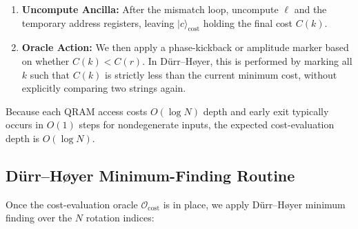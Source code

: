 \documentclass[11pt,letterpaper]{article}
\begin{document}
\begin{enumerate}
\begin{enumerate}
\begin{enumerate}
\[              \;\xrightarrow{\;\mathrm{QRAMRead}\;}\;
              \lvert (k+\ell)\bmod N\rangle \lvert s_{(k+\ell)\bmod N}\rangle_{\text{data}_1},
            \]
            \[
              \lvert (r+\ell)\bmod N\rangle \lvert 0\rangle_{\text{data}_2}
              \;\xrightarrow{\;\mathrm{QRAMRead}\;}\;
              \lvert (r+\ell)\bmod N\rangle \lvert s_{(r+\ell)\bmod N}\rangle_{\text{data}_2}.
            \]
            \item Compare \(\lvert s_{(k+\ell)\bmod N}\rangle\) vs.\ \(\lvert s_{(r+\ell)\bmod N}\rangle\) using a quantum comparator: if \(s_{(k+\ell)\bmod N} \neq s_{(r+\ell)\bmod N}\), 
              deposit penalty \(\delta\) into \(\lvert c\rangle_{\text{cost}}\), then break the loop. Where \(\delta\) is defined as 
              \[\delta = 
              \begin{cases}
                0, & s_{(k+\ell)\bmod N} < s_{(r+\ell)\bmod N}, \\
                1, & s_{(k+\ell)\bmod N} > s_{(r+\ell)\bmod N},
              \end{cases}
              \]
              
            \item If \(s_{(k+\ell)\bmod N} = s_{(r+\ell)\bmod N}\), increment \(\ell\leftarrow\ell+1\) and continue.
        \end{enumerate}
        \item If all \(N\) positions match, leave \(\lvert c\rangle_{\text{cost}}\) as zero (indicating equality).
    \end{enumerate}
    \item \textbf{Uncompute Ancilla:} After the mismatch loop, uncompute \(\ell\) and the temporary address registers, leaving \(\lvert c\rangle_{\text{cost}}\) holding the final cost \(C(k)\).
    \item \textbf{Oracle Action:} We then apply a phase-kickback or amplitude marker based on whether \(C(k) < C(r)\). In D{\"u}rr--H{\o}yer, this is performed by marking all \(k\) such that \(C(k)\) is strictly less than the current minimum cost, without explicitly comparing two strings again.
\end{enumerate}

Because each QRAM access costs \(O(\log N)\) depth and early exit typically occurs in \(O(1)\) steps for nondegenerate inputs, the expected cost-evaluation depth is \(O(\log N)\).

\subsection{D{\"u}rr--H{\o}yer Minimum-Finding Routine}
\label{sec:algorithm:dh}
Once the cost-evaluation oracle \(\mathcal{O}_{\mathrm{cost}}\) is in place, we apply D{\"u}rr--H{\o}yer minimum finding over the \(N\) rotation indices:
\end{document}
